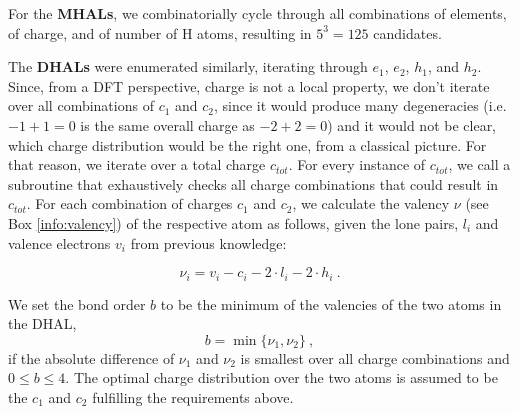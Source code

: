 \documentclass[]{article}
\begin{document}
For the \textbf{MHALs}, we combinatorially cycle through all combinations of elements, of charge, and of number of H atoms, resulting in $5^3=125$ candidates. 

The \textbf{DHALs} were enumerated similarly, iterating through $e_1$, $e_2$, $h_1$, and $h_2$. Since, from a DFT perspective, charge is not a local property, we don't iterate over all combinations of $c_1$ and $c_2$, since it would produce many degeneracies (i.e. $-1+1=0$ is the same overall charge as $-2+2=0$) and it would not be clear, which charge distribution would be the right one, from a classical picture. For that reason, we iterate over a total charge $c_{tot}$. For every instance of $c_{tot}$, we call a subroutine that exhaustively checks all charge combinations that could result in $c_{tot}$. For each combination of charges $c_1$ and $c_2$, we calculate the valency $\nu$ (see Box \ref{info:valency}) of the respective atom as follows, given the lone pairs, $l_i$ and valence electrons $v_i$ from previous knowledge:

\begin{equation}
\label{eq:valency}
\nu_i = v_i - c_i - 2 \cdot l_i - 2 \cdot h_i ~. 
\end{equation}

We set the bond order $b$ to be the minimum of the valencies of the two atoms in the DHAL,
\begin{equation}
b = \min{\{\nu_1,\nu_2\}} ~,
\end{equation}
if the absolute difference of $\nu_1$ and $\nu_2$ is smallest over all charge combinations and $0 \leq b \leq 4$. The optimal charge distribution over the two atoms is assumed to be the $c_1$ and $c_2$ fulfilling the requirements above.
\end{document}
